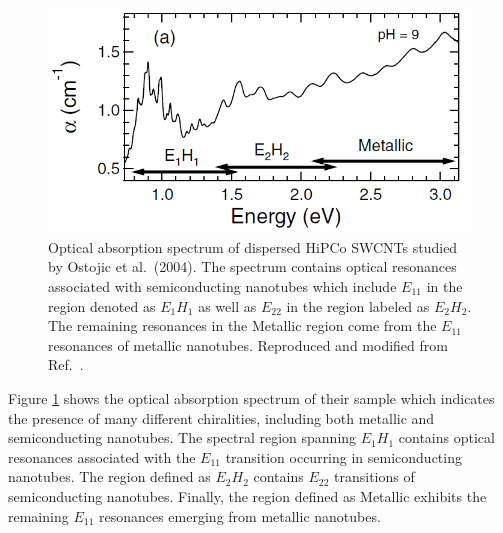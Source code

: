 \begin{figure}[ht]
	\centering
	\includegraphics[scale=0.7]{images/chapter_prior_works/abs_gordana}

	\caption{Optical absorption spectrum of dispersed HiPCo SWCNTs studied by Ostojic et al.\ (2004). The spectrum contains optical resonances associated with semiconducting nanotubes which include $E_{11}$ in the region denoted as $E_{1} H_{1}$ as well as  $E_{22}$ in the region labeled as $E_{2} H_{2}$. The remaining resonances in the Metallic region come from the $E_{11}$ resonances of metallic nanotubes. Reproduced and modified from Ref.\ \cite{ostojic2004interband}.}
	\label{fig:abs_gordana}
\end{figure}


Figure \ref{fig:abs_gordana} shows the optical absorption spectrum of their sample which indicates the presence of many different chiralities, including both metallic and semiconducting nanotubes. The spectral region spanning $E_{1} H_{1}$ contains optical resonances associated with the $E_{11}$ transition occurring in semiconducting nanotubes. The region defined as $E_{2} H_{2}$ contains $E_{22}$ transitions of semiconducting nanotubes. Finally, the region defined as Metallic exhibits the remaining $E_{11}$ resonances emerging from metallic nanotubes.

